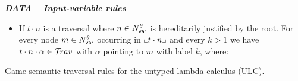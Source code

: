 \documentclass{article}
\theoremstyle{definition}
\newcommand\Nodes{N}%
\newcommand\NodesVar{N_{\sf var}}%
\newcommand{\ghostlmd}{{\lambda\!\!\lambda}}
\newcommand{\ghostvar}{\theta}
\begin{document}
\begin{FramedTable}
\emph{\bf DATA -- Input-variable rules}
\begin{itemize}
\item {} If $t \cdot n$ is a traversal where $n \in \NodesVar^\ghostvar$ is hereditarily justified by the root. For every node $m \in \NodesVar^\ghostvar$ occurring in $\llcorner t\cdot n \lrcorner$
and every $k>1$ we have $t \cdot n \cdot \alpha \in \mathcal{T}\!rav$ with $\alpha$ pointing to $m$ with label $k$, where:
\end{itemize}


\caption{Game-semantic traversal rules for the untyped lambda calculus (ULC).}
 \label{tab:trav_rules}
\end{FramedTable}
\end{document}
